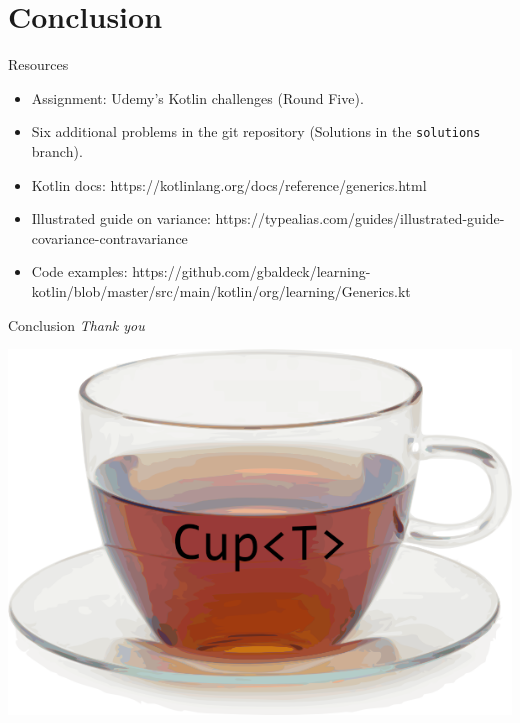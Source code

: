 \documentclass[xcolor=pdftex,dvipsnames,table]{beamer}
\begin{document}
\section{Conclusion}

\begin{frame}[fragile]{Resources}
  \begin{itemize}
    \item Assignment: Udemy's Kotlin challenges (Round Five).
    \item Six additional problems in the git repository (Solutions in the \verb|solutions| branch).
    \item Kotlin docs: https://kotlinlang.org/docs/reference/generics.html
    \item Illustrated guide on variance: https://typealias.com/guides/illustrated-guide-covariance-contravariance
    \item Code examples: https://github.com/gbaldeck/learning-kotlin/blob/master/src/main/kotlin/org/learning/Generics.kt
  \end{itemize}
\end{frame}

\begin{frame}[fragile]{Conclusion}
  \centering
  \vspace{25pt} 
  \LARGE
  \emph{Thank you}
  \small
  \vspace{5pt}
  \begin{center}
    \includegraphics[height=0.5\textheight,keepaspectratio]{images/cup-of-t}
  \end{center}
\end{frame}

\end{document}
